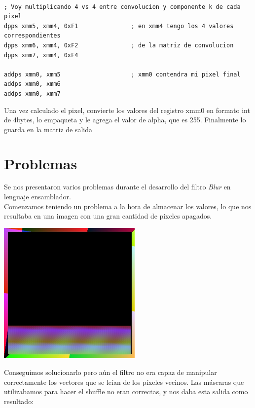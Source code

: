 \documentclass[10pt,a4paper,spanish]{article}
\begin{document}
\begin{codesnippet}
\begin{verbatim}

; Voy multiplicando 4 vs 4 entre convolucion y componente k de cada pixel
dpps xmm5, xmm4, 0xF1               ; en xmm4 tengo los 4 valores correspondientes
dpps xmm6, xmm4, 0xF2               ; de la matriz de convolucion
dpps xmm7, xmm4, 0xF4

addps xmm0, xmm5                    ; xmm0 contendra mi pixel final
addps xmm0, xmm6
addps xmm0, xmm7

\end{verbatim}
\end{codesnippet}

Una vez calculado el pixel, convierte los valores del registro xmm0 en formato int de 4bytes, lo empaqueta y le agrega el valor de alpha, que es 255. Finalmente lo guarda en la matriz de salida

\section{Problemas}

Se nos presentaron varios problemas durante el desarrollo del filtro \textit{Blur} en lenguaje ensamblador. \\

Comenzamos teniendo un problema a la hora de almacenar los valores, lo que nos resultaba en una imagen con una gran cantidad de pixeles apagados. \\

\begin{center}\includegraphics[width=7cm, keepaspectratio]{problema_colores.jpg} \\\end{center}

Conseguimos solucionarlo pero aún el filtro no era capaz de manipular correctamente los vectores que se leían de los píxeles vecinos. Las máscaras que utilizabamos para hacer el shuffle no eran correctas, y nos daba esta salida como resultado: \\
\end{document}
